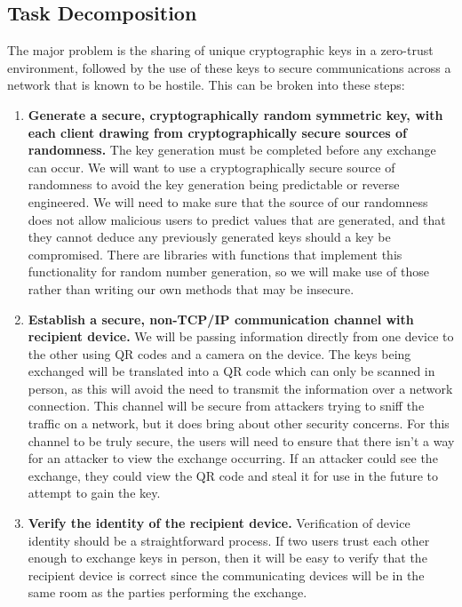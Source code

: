 \documentclass[11pt]{article}
\begin{document}
\subsection{Task Decomposition}
The major problem is the sharing of unique cryptographic keys in a zero-trust environment, followed by the use of these keys to secure communications across a network that is known to be hostile. This can be broken into these steps: 
\begin{enumerate}
	\item{\textbf{Generate a secure, cryptographically random symmetric key, with each client drawing from cryptographically secure sources of randomness.} The key generation must be completed before any exchange can occur. We will want to use a cryptographically secure source of randomness to avoid the key generation being predictable or reverse engineered. We will need to make sure that the source of our randomness does not allow malicious users to predict values that are generated, and that they cannot deduce any previously generated keys should a key be compromised. There are libraries with functions that implement this functionality for random number generation, so we will make use of those rather than writing our own methods that may be insecure.}
	
	\item{\textbf{Establish a secure, non-TCP/IP communication channel with recipient device.} We will be passing information directly from one device to the other using QR codes and a camera on the device. The keys being exchanged will be translated into a QR code which can only be scanned in person, as this will avoid the need to transmit the information over a network connection. This channel will be secure from attackers trying to sniff the traffic on a network, but it does bring about other security concerns. For this channel to be truly secure, the users will need to ensure that there isn’t a way for an attacker to view the exchange occurring. If an attacker could see the exchange, they could view the QR code and steal it for use in the future to attempt to gain the key. }
	
	\item{\textbf{Verify the identity of the recipient device.}	Verification of device identity should be a straightforward process. If two users trust each other enough to exchange keys in person, then it will be easy to verify that the recipient device is correct since the communicating devices will be in the same room as the parties performing the exchange.}
	

\end{enumerate}
\end{document}
